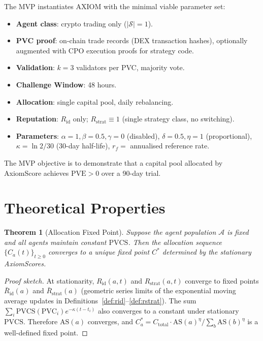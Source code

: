 \documentclass[11pt,a4paper]{article}
\theoremstyle{plain}
\newtheorem{theorem}{Theorem}[section]
\theoremstyle{definition}
\theoremstyle{remark}
\newcommand{\PVC}{\mathrm{PVC}}
\newcommand{\PVCS}{\mathrm{PVCS}}
\newcommand{\PVE}{\mathrm{PVE}}
\newcommand{\AS}{\mathrm{AS}}
\newcommand{\Rid}{R_{\mathrm{id}}}
\newcommand{\Rstrat}{R_{\mathrm{strat}}}
\begin{document}
The MVP instantiates AXIOM with the minimal viable parameter set:

\begin{itemize}
  \item \textbf{Agent class}: crypto trading only ($|\mathcal{S}| = 1$).
  \item \textbf{PVC proof}: on-chain trade records (DEX transaction hashes),
        optionally augmented with CPO execution proofs for strategy code.
  \item \textbf{Validation}: $k = 3$ validators per PVC, majority vote.
  \item \textbf{Challenge Window}: 48 hours.
  \item \textbf{Allocation}: single capital pool, daily rebalancing.
  \item \textbf{Reputation}: $\Rid$ only; $\Rstrat \equiv 1$ (single strategy
        class, no switching).
  \item \textbf{Parameters}: $\alpha = 1, \beta = 0.5, \gamma = 0$ (disabled),
        $\delta = 0.5, \eta = 1$ (proportional), $\kappa = \ln 2 / 30$ (30-day
        half-life), $r_f = $ annualised reference rate.
\end{itemize}

The MVP objective is to demonstrate that a capital pool allocated by AxiomScore
achieves $\PVE > 0$ over a 90-day trial.

\section{Theoretical Properties}

\begin{theorem}[Allocation Fixed Point]
\label{thm:fixedpoint}
Suppose the agent population $\mathcal{A}$ is fixed and all agents maintain
constant $\PVCS$. Then the allocation sequence $\{C_a(t)\}_{t \ge 0}$ converges
to a unique fixed point $C^*$ determined by the stationary AxiomScores.
\end{theorem}

\begin{proof}[Proof sketch]
At stationarity, $\Rid(a,t)$ and $\Rstrat(a,t)$ converge to fixed points
$\bar{R}_{\mathrm{id}}(a)$ and $\bar{R}_{\mathrm{strat}}(a)$ (geometric
series limits of the exponential moving average updates in
Definitions~\ref{def:rid}--\ref{def:rstrat}). The sum
$\sum_i \PVCS(\PVC_i) e^{-\kappa(t-t_i)}$ also converges to a constant
under stationary $\PVCS$. Therefore $\AS(a)$ converges, and $C_a^* =
C_{\mathrm{total}} \cdot \AS(a)^\eta / \sum_b \AS(b)^\eta$ is a well-defined
fixed point.
\end{proof}
\end{document}
